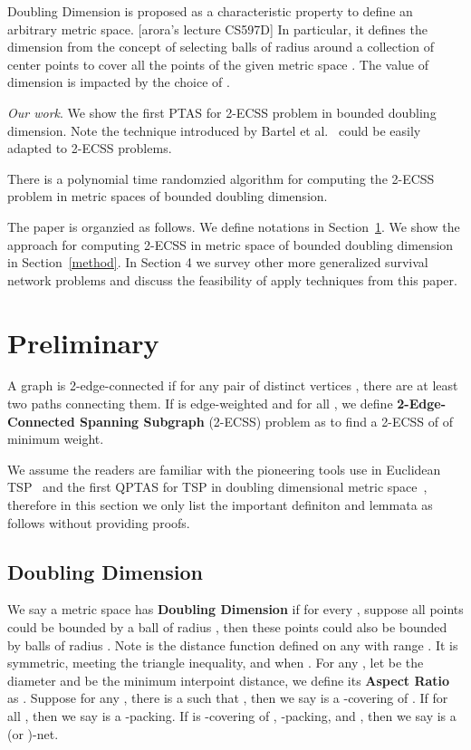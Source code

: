 \documentclass{llncs}
\begin{document}
Doubling Dimension is proposed as a characteristic property to define an arbitrary metric space. [arora's lecture CS597D]
In particular, it defines the dimension from the concept of selecting balls of radius  around a collection of center points to cover all the points of the given metric space .
The value of dimension  is impacted by the choice of .


\emph{Our work}. We show the first PTAS for 2-ECSS problem in bounded doubling dimension.
Note the technique introduced by Bartel {et al.}~\cite{Bartal12} could be easily adapted to 2-ECSS problems.

\begin{theorem}
There is a polynomial time randomzied algorithm for computing the 2-ECSS problem in metric spaces of bounded doubling dimension. 
\end{theorem}

The paper is organzied as follows.
We define notations in Section~\ref{prelim}.
We show the approach for computing 2-ECSS in metric space of bounded doubling dimension in Section~\ref{method}.
In Section 4 we survey other more generalized survival network problems and discuss the feasibility of apply techniques from this paper.


\section{Preliminary}
\label{prelim}

A graph  is 2-edge-connected if for any pair of distinct vertices , there are at least two paths connecting them.
If  is edge-weighted and  for all , we define \textbf{2-Edge-Connected Spanning Subgraph} (2-ECSS) problem as to find a 2-ECSS of  of minimum weight.

We assume the readers are familiar with the pioneering tools use in Euclidean TSP~\cite{Arora98} and the first QPTAS for TSP in doubling dimensional metric space~\cite{Talwar04}, therefore in this section we only list the important definiton and lemmata as follows without providing proofs.

\subsection{Doubling Dimension}
We say a metric space  has \textbf{Doubling Dimension}  if for every , suppose all  points could be bounded by a ball of radius , then these points could also be bounded by  balls of radius .
Note  is the distance function defined on any  with range . It is symmetric, meeting the triangle inequality, and  when .
For any , let  be the diameter and  be the minimum interpoint distance, we define its \textbf{Aspect Ratio} as .
Suppose for any , there is a  such that , then we say  is a -covering of .
If  for all , then we say  is a -packing. 
If  is -covering of , -packing, and , then we say  is a (or )-net.\newline
\end{document}
